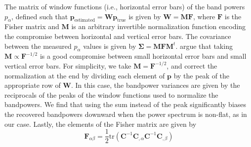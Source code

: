 \documentclass[numberedappendix]{emulateapj}
\newcommand{\Fb}{\mathbf{F}}
\newcommand{\Mb}{\mathbf{M}}
\newcommand{\Cb}{\mathbf{C}}
\newcommand{\pb}{\mathbf{p}}
\newcommand{\Wb}{\mathbf{W}}
\begin{document}
The matrix of window functions (i.e., horizontal error bars) of the band powers $p_\alpha$, defined such that $\pb_\text{estimated}=\Wb\pb_\text{true}$ is given by $\Wb=\Mb\Fb$, where $\Fb$ is the Fisher matrix and $\Mb$ is an arbitrary invertible normalization function encoding the compromise between horizontal and vertical error bars. The covariance between the measured $p_\alpha$ values is given by $\mathbf{\Sigma} = \Mb\Fb\Mb^t$. \citet{X13} argue that taking $\Mb\propto \Fb^{-1/2}$ is a good compromise between small horizontal error bars and small vertical error bars. For simplicity, we take $\Mb=\Fb^{-1/2}$, and correct the normalization at the end by dividing each element of $\pb$ by the peak of the appropriate row of $\Wb$. In this case, the bandpower variances are given by the reciprocals of the peaks of the window functions used to normalize the bandpowers. We find that using the sum instead of the peak significantly biases the recovered bandpowers downward when the power spectrum is non-flat, as in our case. Lastly, the elements of the Fisher matrix are given by
\begin{equation}
\Fb_{\alpha\beta}=\frac{1}{2}\text{tr}\left(\Cb^{-1} \Cb_{,\alpha} \Cb^{-1} \Cb_{,\beta} \right)	
\end{equation}
\end{document}
